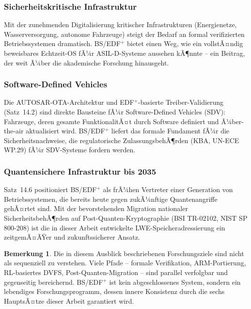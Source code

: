 ﻿\documentclass[a4paper,12pt]{scrreprt}
\theoremstyle{definition}
\newtheorem{bemerkung}{Bemerkung}[chapter]
\begin{document}
	\subsubsection{Sicherheitskritische Infrastruktur}
	
	Mit der zunehmenden Digitalisierung kritischer Infrastrukturen
	(Energienetze, Wasserversorgung, autonome Fahrzeuge) steigt der
	Bedarf an formal verifizierten Betriebssystemen dramatisch.
	BS/EDF$^+$ bietet einen Weg, wie ein vollstÃ¤ndig beweisbares
	Echtzeit-OS fÃ¼r ASIL-D-Systeme aussehen kÃ¶nnte -- ein Beitrag,
	der weit Ã¼ber die akademische Forschung hinausgeht.
	
	\subsubsection{Software-Defined Vehicles}
	
	Die AUTOSAR-OTA-Architektur \cite{Epp2026autsre} und 
	EDF$^+$-basierte Treiber-Validierung (Satz~14.2) sind direkte
	Bausteine fÃ¼r Software-Defined Vehicles (SDV): Fahrzeuge, deren
	gesamte FunktionalitÃ¤t durch Software definiert und Ã¼ber-the-air
	aktualisiert wird. BS/EDF$^+$ liefert das formale Fundament fÃ¼r
	die Sicherheitsnachweise, die regulatorische ZulassungsbehÃ¶rden
	(KBA, UN-ECE WP.29) fÃ¼r SDV-Systeme fordern werden.
	
	\subsubsection{Quantensichere Infrastruktur bis 2035}
	
	Satz~14.6 positioniert BS/EDF$^+$ als frÃ¼hen Vertreter
	einer Generation von Betriebssystemen, die bereits heute
	gegen zukÃ¼nftige Quantenangriffe gehÃ¤rtet sind. Mit der
	bevorstehenden Migration nationaler SicherheitsbehÃ¶rden
	auf Post-Quanten-Kryptographie (BSI TR-02102, NIST SP 800-208)
	ist die in dieser Arbeit entwickelte LWE-Speicheradressierung
	ein zeitgemÃ¤ÃŸer und zukunftssicherer Ansatz.
	
	\begin{bemerkung}
		Die in diesem Ausblick beschriebenen Forschungsziele sind nicht
		als sequenziell zu verstehen. Viele Pfade -- formale Verifikation,
		ARM-Portierung, RL-basiertes DVFS, Post-Quanten-Migration --
		sind parallel verfolgbar und gegenseitig bereichernd.
		BS/EDF$^+$ ist kein abgeschlossenes System, sondern ein
		lebendiges Forschungsprogramm, dessen innere Konsistenz durch
		die sechs HauptsÃ¤tze dieser Arbeit garantiert wird.
	\end{bemerkung}
	
\end{document}
